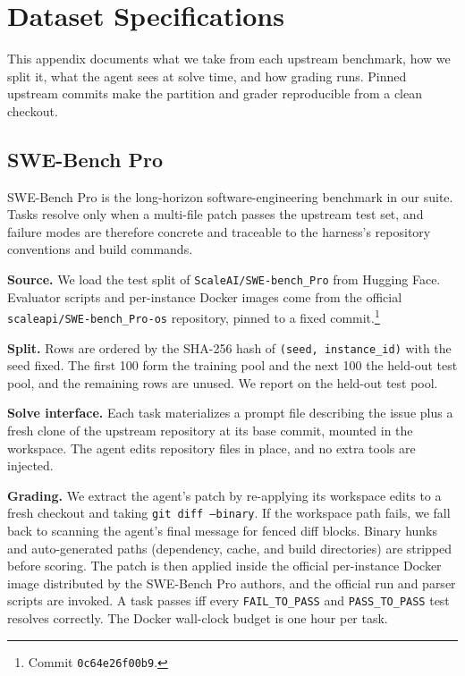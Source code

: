\section{Dataset Specifications}\label{app:datasets}

 This appendix documents what we take from each upstream benchmark, how we split it, what the agent sees at solve time, and how grading runs.
Pinned upstream commits make the partition and grader reproducible from a clean checkout.

\subsection{SWE-Bench Pro}

SWE-Bench Pro \citep{deng2025swebenchpro} is the long-horizon software-engineering benchmark in our suite.
Tasks resolve only when a multi-file patch passes the upstream test set, and failure modes are therefore concrete and traceable to the harness's repository conventions and build commands.

\noindent\textbf{Source.}
We load the test split of \texttt{ScaleAI/SWE-bench\_Pro} from Hugging Face.
Evaluator scripts and per-instance Docker images come from the official \texttt{scaleapi/SWE-bench\_Pro-os} repository, pinned to a fixed commit.\footnote{Commit \texttt{0c64e26f00b9}.}

\noindent\textbf{Split.}
Rows are ordered by the SHA-256 hash of \texttt{(seed, instance\_id)} with the seed fixed.
The first 100 form the training pool and the next 100 the held-out test pool, and the remaining rows are unused.
We report on the held-out test pool.

\noindent\textbf{Solve interface.}
Each task materializes a prompt file describing the issue plus a fresh clone of the upstream repository at its base commit, mounted in the workspace.
The agent edits repository files in place, and no extra tools are injected.

\noindent\textbf{Grading.}
We extract the agent's patch by re-applying its workspace edits to a fresh checkout and taking \texttt{git diff --binary}.
If the workspace path fails, we fall back to scanning the agent's final message for fenced diff blocks.
Binary hunks and auto-generated paths (dependency, cache, and build directories) are stripped before scoring.
The patch is then applied inside the official per-instance Docker image distributed by the SWE-Bench Pro authors, and the official run and parser scripts are invoked.
A task passes iff every \texttt{FAIL\_TO\_PASS} and \texttt{PASS\_TO\_PASS} test resolves correctly.
The Docker wall-clock budget is one hour per task.

